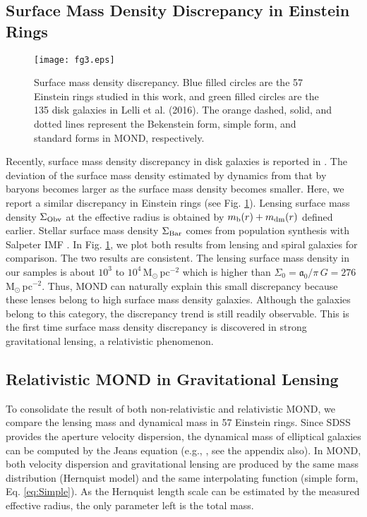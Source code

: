 \documentclass[fleqn,usenatbib,useAMS]{mnras}
\begin{document}
        \subsection{Surface Mass Density Discrepancy in Einstein Rings}

        \begin{figure}
            \texttt{[image: fg3.eps]}
            \caption{
            Surface mass density discrepancy.
            Blue filled circles are the 57 Einstein rings studied in this work, and green filled circles are the 135 disk galaxies in Lelli et al. (2016).
            The orange dashed, solid, and dotted lines represent the Bekenstein form, simple form, and standard forms in MOND, respectively.
            }\label{fig:SurDis}
        \end{figure}

    Recently, surface mass density discrepancy in disk galaxies is reported in \cite{Lelli16,Milgrom16}.
    The deviation of the surface mass density estimated by dynamics from that by baryons becomes larger as the surface mass density becomes smaller.
    Here, we report a similar discrepancy in Einstein rings (see Fig. \ref{fig:SurDis}).
    Lensing surface mass density $\Sigma_{\rm Obv}$ at the effective radius is obtained by $m_{\rm b}(r)+m_{\rm dm}(r)$ defined earlier.
    Stellar surface mass density $\Sigma_{\rm Bar}$ comes from population synthesis with Salpeter IMF \citep{Auger09}.
    In Fig. \ref{fig:SurDis}, we plot both results from lensing and spiral galaxies \citep{Lelli16} for comparison.
    The two results are consistent.
    The lensing surface mass density in our samples is about $10^{3}$ to $10^{4}$\,M$_{\odot}$\,pc$^{-2}$ which is higher than $\Sigma_0=\mathfrak{a}_0/\pi\,G=276$\,M$_{\odot}$\,pc$^{-2}$.
    Thus, MOND can naturally explain this small discrepancy because these lenses belong to high surface mass density galaxies.
    Although the galaxies belong to this category, the discrepancy trend is still readily observable.
    This is the first time surface mass density discrepancy is discovered in strong gravitational lensing, a relativistic phenomenon.

        \subsection{Relativistic MOND in Gravitational Lensing}

    To consolidate the result of both non-relativistic and relativistic MOND, we compare the lensing mass and dynamical mass in 57 Einstein rings.
    Since SDSS provides the aperture velocity dispersion, the dynamical mass of elliptical galaxies can be computed by the Jeans equation (e.g., \cite{Binney08}, see the appendix also).
    In MOND, both velocity dispersion and gravitational lensing are produced by the same mass distribution (Hernquist model) and the same interpolating function (simple form, Eq. \ref{eq:Simple}).
    As the Hernquist length scale can be estimated by the measured effective radius, the only parameter left is the total mass.
\end{document}

